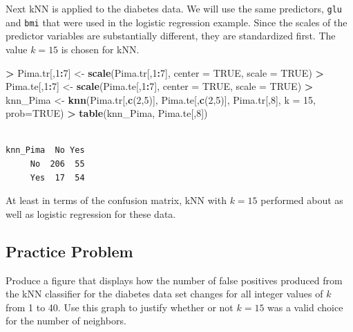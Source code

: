 \documentclass[
]{krantz}
\makeatletter
\newenvironment{Shaded}{\begin{snugshade}}{\end{snugshade}}
\newcommand{\DataTypeTok}[1]{\textcolor[rgb]{0.27,0.27,0.27}{#1}}
\newcommand{\DecValTok}[1]{\textcolor[rgb]{0.06,0.06,0.06}{#1}}
\newcommand{\KeywordTok}[1]{\textcolor[rgb]{0.27,0.27,0.27}{\textbf{#1}}}
\newcommand{\NormalTok}[1]{#1}
\newcommand{\OperatorTok}[1]{\textcolor[rgb]{0.43,0.43,0.43}{\textbf{#1}}}
\newcommand{\OtherTok}[1]{\textcolor[rgb]{0.37,0.37,0.37}{#1}}
\newcommand{\StringTok}[1]{\textcolor[rgb]{0.5,0.5,0.5}{#1}}
\newenvironment{kframe}{%
\medskip{}
\setlength{\fboxsep}{.8em}
 \def\at@end@of@kframe{}%
 \ifinner\ifhmode%
  \def\at@end@of@kframe{\end{minipage}}%
  \begin{minipage}{\columnwidth}%
 \fi\fi%
 \def\FrameCommand##1{\hskip\@totalleftmargin \hskip-\fboxsep
 \colorbox{shadecolor}{##1}\hskip-\fboxsep
     \hskip-\linewidth \hskip-\@totalleftmargin \hskip\columnwidth}%
 \MakeFramed {\advance\hsize-\width
   \@totalleftmargin\z@ \linewidth\hsize
   \@setminipage}}%
 {\par\unskip\endMakeFramed%
 \at@end@of@kframe}
\renewenvironment{Shaded}{\begin{kframe}}{\end{kframe}}
\makeatother
\begin{document}
Next kNN is applied to the diabetes data. We will use the same predictors, \texttt{glu} and \texttt{bmi} that were used in the logistic regression example. Since the scales of the predictor variables are substantially different, they are standardized first. The value \(k=15\) is chosen for kNN.

\begin{Shaded}
\begin{Highlighting}[]
\OperatorTok{\textgreater{}}\StringTok{ }\NormalTok{Pima.tr[,}\DecValTok{1}\OperatorTok{:}\DecValTok{7}\NormalTok{] \textless{}{-}}\StringTok{ }\KeywordTok{scale}\NormalTok{(Pima.tr[,}\DecValTok{1}\OperatorTok{:}\DecValTok{7}\NormalTok{], }\DataTypeTok{center =} \OtherTok{TRUE}\NormalTok{, }\DataTypeTok{scale =} \OtherTok{TRUE}\NormalTok{)}
\OperatorTok{\textgreater{}}\StringTok{ }\NormalTok{Pima.te[,}\DecValTok{1}\OperatorTok{:}\DecValTok{7}\NormalTok{] \textless{}{-}}\StringTok{ }\KeywordTok{scale}\NormalTok{(Pima.te[,}\DecValTok{1}\OperatorTok{:}\DecValTok{7}\NormalTok{], }\DataTypeTok{center =} \OtherTok{TRUE}\NormalTok{, }\DataTypeTok{scale =} \OtherTok{TRUE}\NormalTok{)}
\OperatorTok{\textgreater{}}\StringTok{ }\NormalTok{knn\_Pima \textless{}{-}}\StringTok{ }\KeywordTok{knn}\NormalTok{(Pima.tr[,}\KeywordTok{c}\NormalTok{(}\DecValTok{2}\NormalTok{,}\DecValTok{5}\NormalTok{)], Pima.te[,}\KeywordTok{c}\NormalTok{(}\DecValTok{2}\NormalTok{,}\DecValTok{5}\NormalTok{)], Pima.tr[,}\DecValTok{8}\NormalTok{], }\DataTypeTok{k =} \DecValTok{15}\NormalTok{, }\DataTypeTok{prob=}\OtherTok{TRUE}\NormalTok{)}
\OperatorTok{\textgreater{}}\StringTok{ }\KeywordTok{table}\NormalTok{(knn\_Pima, Pima.te[,}\DecValTok{8}\NormalTok{])}
\end{Highlighting}
\end{Shaded}

\begin{verbatim}
        
knn_Pima  No Yes
     No  206  55
     Yes  17  54
\end{verbatim}

At least in terms of the confusion matrix, kNN with \(k=15\) performed about as well as logistic regression for these data.

\hypertarget{practice-problem-13}{%
\subsection{Practice Problem}\label{practice-problem-13}}

Produce a figure that displays how the number of false positives produced from the kNN classifier for the diabetes data set changes for all integer values of \(k\) from 1 to 40. Use this graph to justify whether or not \(k = 15\) was a valid choice for the number of neighbors.
\end{document}
